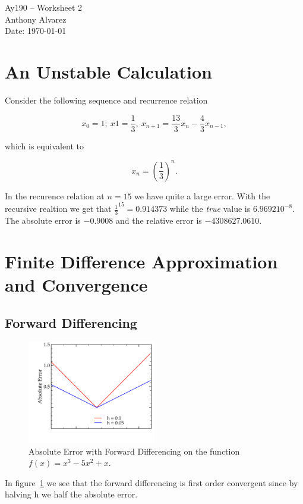 \documentclass[11pt,letterpaper]{article}
\begin{document}
\begin{center}
\Large
Ay190 -- Worksheet 2\\
Anthony Alvarez\\
Date: \today
\end{center}

\section{An Unstable Calculation}

Consider the following sequence and recurrence relation 

$$ x_0 = 1;\ x1=\frac{1}{3},\ x_{n+1} = \frac{13}{3} x_n - \frac{4}{3}x_{n-1},$$

which is equivalent to 

$$ x_n = \left( \frac{1}{3} \right)^n .$$

In the recurence relation at $n = 15$ we have quite a large error. With the
recursive realtion we get that $\frac{1}{3} ^ {15} =0.914373$ while the 
{\it true} value is $6.9692 10 ^{-8}$.  The absolute error is $-0.9008$ and 
the relative error is $-4308627.0610$.

\section{Finite Difference Approximation and Convergence}

\subsection{Forward Differencing}

\begin{figure}[bth]
\centering
\includegraphics[width=0.5\textwidth]{forward_difference.pdf}
\caption{Absolute Error with Forward Differencing on the function $f(x) = 
x^3 -5x^2+x$.}
\label{fig:forward_difference}
\end{figure}

In figure~\ref{fig:forward_difference} we see that the forward differencing is
first order convergent since by halving h we half the absolute error.
\end{document}
